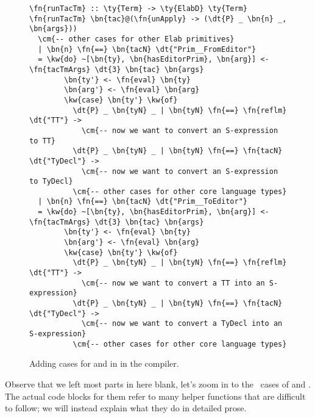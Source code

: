 \begin{figure}[ht]
\caption{Adding cases for  and  in  in the compiler.}
\label{code:runElabAction}
\begin{Verbatim}[framesep=2mm, label=\footnotesize{\normalfont{Haskell}}, labelposition=topline]
\fn{runTacTm} :: \ty{Term} -> \ty{ElabD} \ty{Term}
\fn{runTacTm} \bn{tac}@(\fn{unApply} -> (\dt{P} _ \bn{n} _, \bn{args}))
  \cm{-- other cases for other Elab primitives}
  | \bn{n} \fn{==} \bn{tacN} \dt{"Prim__FromEditor"}
  = \kw{do} ~[\bn{ty}, \bn{hasEditorPrim}, \bn{arg}] <- \fn{tacTmArgs} \dt{3} \bn{tac} \bn{args}
        \bn{ty'} <- \fn{eval} \bn{ty}
        \bn{arg'} <- \fn{eval} \bn{arg}
        \kw{case} \bn{ty'} \kw{of}
          \dt{P} _ \bn{tyN} _ | \bn{tyN} \fn{==} \fn{reflm} \dt{"TT"} ->
            \cm{-- now we want to convert an S-expression to TT}
          \dt{P} _ \bn{tyN} _ | \bn{tyN} \fn{==} \fn{tacN} \dt{"TyDecl"} ->
            \cm{-- now we want to convert an S-expression to TyDecl}
          \cm{-- other cases for other core language types}
  | \bn{n} \fn{==} \bn{tacN} \dt{"Prim__ToEditor"}
  = \kw{do} ~[\bn{ty}, \bn{hasEditorPrim}, \bn{arg}] <- \fn{tacTmArgs} \dt{3} \bn{tac} \bn{args}
        \bn{ty'} <- \fn{eval} \bn{ty}
        \bn{arg'} <- \fn{eval} \bn{arg}
        \kw{case} \bn{ty'} \kw{of}
          \dt{P} _ \bn{tyN} _ | \bn{tyN} \fn{==} \fn{reflm} \dt{"TT"} ->
            \cm{-- now we want to convert a TT into an S-expression}
          \dt{P} _ \bn{tyN} _ | \bn{tyN} \fn{==} \fn{tacN} \dt{"TyDecl"} ->
            \cm{-- now we want to convert a TyDecl into an S-expression}
          \cm{-- other cases for other core language types}
\end{Verbatim}
\end{figure}

Observe that we left most parts in here blank, let's zoom in to the \TT\ cases
  of  and . The actual code blocks
  for them refer to many helper functions that are difficult to follow; we will
  instead explain what they do in detailed prose.

